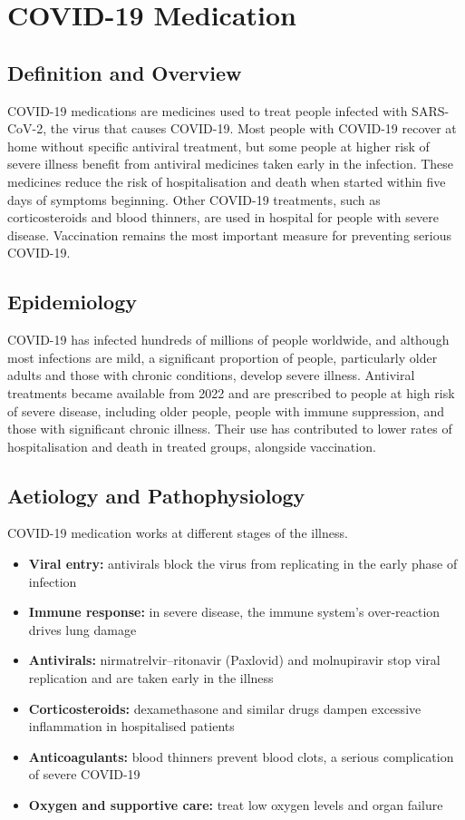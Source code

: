 \chapter{COVID-19 Medication}

\section*{Definition and Overview}
COVID-19 medications are medicines used to treat people infected with SARS-CoV-2, the virus that causes COVID-19. Most people with COVID-19 recover at home without specific antiviral treatment, but some people at higher risk of severe illness benefit from antiviral medicines taken early in the infection. These medicines reduce the risk of hospitalisation and death when started within five days of symptoms beginning. Other COVID-19 treatments, such as corticosteroids and blood thinners, are used in hospital for people with severe disease. Vaccination remains the most important measure for preventing serious COVID-19.

\section*{Epidemiology}
COVID-19 has infected hundreds of millions of people worldwide, and although most infections are mild, a significant proportion of people, particularly older adults and those with chronic conditions, develop severe illness. Antiviral treatments became available from 2022 and are prescribed to people at high risk of severe disease, including older people, people with immune suppression, and those with significant chronic illness. Their use has contributed to lower rates of hospitalisation and death in treated groups, alongside vaccination.

\section*{Aetiology and Pathophysiology}
COVID-19 medication works at different stages of the illness.

\begin{itemize}
    \item \textbf{Viral entry:} antivirals block the virus from replicating in the early phase of infection
    \item \textbf{Immune response:} in severe disease, the immune system's over-reaction drives lung damage
    \item \textbf{Antivirals:} nirmatrelvir--ritonavir (Paxlovid) and molnupiravir stop viral replication and are taken early in the illness
    \item \textbf{Corticosteroids:} dexamethasone and similar drugs dampen excessive inflammation in hospitalised patients
    \item \textbf{Anticoagulants:} blood thinners prevent blood clots, a serious complication of severe COVID-19
    \item \textbf{Oxygen and supportive care:} treat low oxygen levels and organ failure
\end{itemize}

